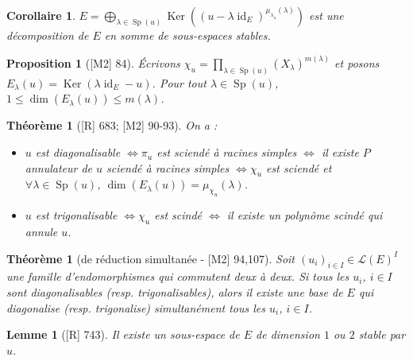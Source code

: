 \documentclass[10pt, a4paper, parskip=full, twoside, twocolumn]{report}
\newtheorem{theorem}[definition]{Théorème}
\newtheorem{proposition}[definition]{Proposition}
\newtheorem{lemma}[definition]{Lemme}
\newtheorem{corollary}[definition]{Corollaire}
\DeclareMathOperator{\Ker}{Ker}
\DeclareMathOperator{\id}{id}
\DeclareMathOperator{\Sp}{Sp}
\begin{document}
\begin{corollary}
	$E = \bigoplus_{\lambda\in \Sp(u)} \Ker\left(\left(u-\lambda \id_E\right)^{\mu_{\lambda_u}(\lambda)}\right)$
	est une décomposition de $E$ en somme de sous-espaces stables.
\end{corollary}

\begin{proposition}[\textnormal{[M2] 84}]
	Écrivons $\chi_u = \prod_{\lambda\in\Sp(u)} \left(X_\lambda\right)^{m(\lambda)}$
	et posons $E_{\lambda}(u)=\Ker(\lambda\id_E - u)$.
	Pour tout $\lambda\in \Sp(u)$, $1\leq \dim(E_{\lambda}(u))\leq m(\lambda)$.
\end{proposition}

\begin{theorem}[\textnormal{[R] 683; [M2] 90-93}]
	On a :
	\begin{itemize}
		\item $u$ est diagonalisable $\iff \pi_u$ est sciendé à racines simples $\iff$ il existe $P$ annulateur de $u$ sciendé à racines simples $\iff \chi_u$ est sciendé et $\forall\lambda\in\Sp(u)$, $\dim(E_{\lambda}(u)) = \mu_{\chi_u}(\lambda)$.
		\item $u$ est trigonalisable $\iff \chi_u$ est scindé $\iff$ il existe un polynôme scindé qui annule $u$.
	\end{itemize}
\end{theorem}

\begin{theorem}[de réduction simultanée - \textnormal{[M2] 94,107}]
	Soit $\left(u_i\right)_{i\in I}\in\mathcal{L}(E)^I$ une famille d'endomorphismes qui commutent deux à deux.
	Si tous les $u_i$, $i\in I$ sont diagonalisables (resp. trigonalisables), alors il existe une base de $E$ qui 
	diagonalise (resp. trigonalise) simultanément tous les $u_i$, $i\in I$.
\end{theorem}


\begin{tcolorbox}[
    breakable, %
    colback=developpement, %
    colframe=gray!0!black, %
    boxrule=0pt, %
    arc=1mm, %
	boxsep=0pt,
	left=0pt, right=0pt, top=0pt, bottom=0pt
]
\begin{lemma}[\textnormal{[R] 743}]
	\label{151dev11}
	Il existe un sous-espace de $E$ de dimension $1$ ou $2$ stable par $u$.
\end{lemma}
\end{tcolorbox}
\end{document}
